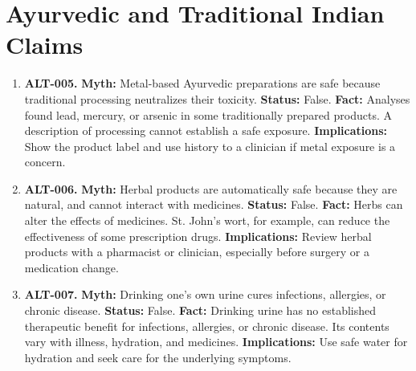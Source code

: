 \documentclass[11pt,oneside]{book}
\begin{document}
\section{Ayurvedic and Traditional Indian Claims}
\begin{enumerate}[leftmargin=0pt,labelwidth=0pt,labelsep=0pt,itemindent=0pt]
\item[] \textbf{ALT-005.} \textbf{Myth:} Metal-based Ayurvedic preparations are safe because traditional processing neutralizes their toxicity.\newline
\textbf{Status:} False.\newline
\textbf{Fact:} Analyses found lead, mercury, or arsenic in some traditionally prepared products. A description of processing cannot establish a safe exposure. \cite{ref115,ref116}\newline
\textbf{Implications:} Show the product label and use history to a clinician if metal exposure is a concern.
\item[] \textbf{ALT-006.} \textbf{Myth:} Herbal products are automatically safe because they are natural, and cannot interact with medicines.\newline
\textbf{Status:} False.\newline
\textbf{Fact:} Herbs can alter the effects of medicines. St. John's wort, for example, can reduce the effectiveness of some prescription drugs. \cite{ref117,ref297}\newline
\textbf{Implications:} Review herbal products with a pharmacist or clinician, especially before surgery or a medication change.
\item[] \textbf{ALT-007.} \textbf{Myth:} Drinking one's own urine cures infections, allergies, or chronic disease.\newline
\textbf{Status:} False.\newline
\textbf{Fact:} Drinking urine has no established therapeutic benefit for infections, allergies, or chronic disease. Its contents vary with illness, hydration, and medicines. \cite{ref393}\newline
\textbf{Implications:} Use safe water for hydration and seek care for the underlying symptoms.
\end{enumerate}
\end{document}

